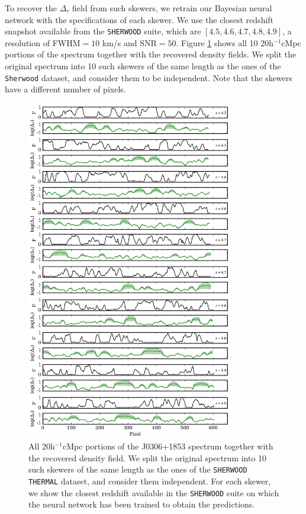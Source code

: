 To recover the $\Delta_\tau$ field from such skewers, we retrain our Bayesian neural network with the specifications of each skewer. We use the closest redshift snapshot available from the \texttt{SHERWOOD} suite, which are $[4.5, 4.6, 4.7, 4.8, 4.9]$, a resolution of FWHM$=10$ km/s and SNR$=50$. Figure \ref{fig: ghost rec} shows all 10 20h$^{-1}$cMpc portions of the spectrum together with the recovered density fields. We split the original spectrum into 10 such skewers of the same length as the ones of the \texttt{Sherwood} dataset, and consider them to be independent. Note that the skewers have a different number of pixels.


\begin{figure}
    \centering
    \includegraphics[width=0.8\textwidth]{img/ML/GHOST_reconstructions.png}
    \caption{All 20h$^{-1}$cMpc portions of the J0306+1853 spectrum together with the recovered density field. We split the original spectrum into 10 such skewers of the same length as the ones of the \texttt{SHERWOOD THERMAL} dataset, and consider them independent. For each skewer, we show the closest redshift available in the \texttt{SHERWOOD} suite on which the neural network has been trained to obtain the predictions.}
    \label{fig: ghost rec}
\end{figure}

